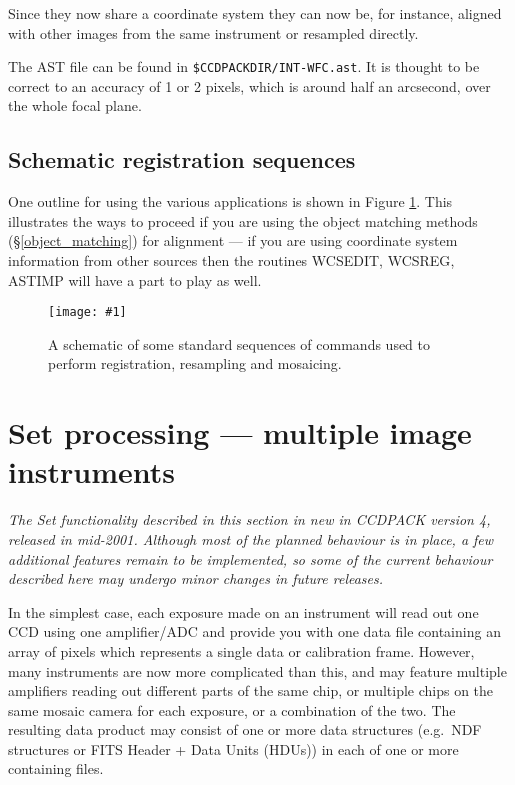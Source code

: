 \documentclass[twoside,11pt]{article}
\newcommand{\htmladdimg}[1]{}
\newcommand{\hyperref}[4]{#2\ref{#4}#3}
\newcommand{\htmlref}[2]{#1}
\newcommand{\xlabel}[1]{}
\renewcommand{\_}{\texttt{\symbol{95}}}
\newcommand{\xroutine}[1]{\htmlref{{\sc #1}}{#1}}
\newcommand{\myfig} [5] {
  \begin{figure}
    \centering\texttt{[image: \#1]}
    \typeout{#1 inserted on page \arabic{page}}
    \caption{\label{#4}#5}
  \end{figure}
  }
\newcommand{\myfig}[5]{
    \htmladdimg{#3}\\
    Figure: \label{#4} #5
    }
\begin{document}
Since they now share a coordinate system they can now be, for instance,
aligned with other images from the same instrument or resampled directly.

The AST file can be found in {\tt \$CCDPACK\_DIR/INT-WFC.ast}.
It is thought to be correct to an accuracy of 1 or 2 pixels, 
which is around half an arcsecond, over the whole focal plane.


\subsection{Schematic registration sequences}

One outline for using the various applications is shown in 
\hyperref{the following figure}{Figure }{}{registration}.
This illustrates the ways to proceed if you are using the
object matching methods (\S \ref{object_matching}) 
for alignment --- if you are using coordinate system information
from other sources then the routines 
\xroutine{WCSEDIT}, \xroutine{WCSREG}, \xroutine{ASTIMP}
will have a part to play as well.

\myfig{sun139reg.eps}{}{reg.gif}{registration}
{A schematic of some standard sequences of commands used to perform
registration, resampling and mosaicing.}

\clearpage


\section{\xlabel{ccdpack_sets}Set processing --- multiple image instruments
         \label{ccdpack_sets}}

{\em
The Set functionality described in this section in new in 
CCDPACK version 4, released in mid-2001.
Although most of the planned behaviour is in place, 
a few additional features remain to be implemented,
so some of the current behaviour described here may undergo minor changes
in future releases.
}


In the simplest case, each exposure made on an instrument
will read out one CCD using one amplifier/ADC and provide you 
with one data file containing an array 
of pixels which represents a single data or calibration frame.
However, many instruments are now more complicated than this,
and may feature multiple amplifiers reading out different parts of
the same chip, 
or multiple chips on the same mosaic camera for each
exposure, or a combination of the two.  
The resulting data product may consist of one or more data
structures (e.g.\ NDF structures or FITS Header + Data Units (HDUs)) 
in each of one or more containing files.
\end{document}
